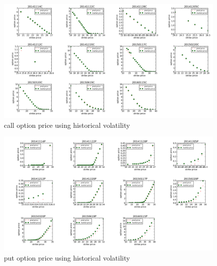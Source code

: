 \begin{landscape}
\begin{figure}[H]
\centering
\includegraphics[width=\linewidth]{hisVolaCall.png}
\caption{call option price using historical volatility}
\end{figure}
\begin{figure}[H]
\centering
\includegraphics[width=\linewidth]{hisVolaPut.png}
\caption{put option price using historical volatility}
\end{figure}


\end{landscape}
